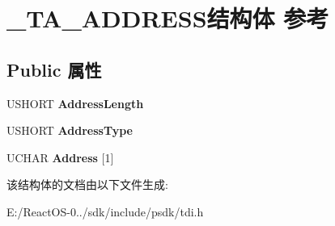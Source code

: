 \hypertarget{struct___t_a___a_d_d_r_e_s_s}{}\section{\+\_\+\+T\+A\+\_\+\+A\+D\+D\+R\+E\+S\+S结构体 参考}
\label{struct___t_a___a_d_d_r_e_s_s}
\subsection*{Public 属性}
\begin{DoxyCompactItemize}
\item 
\mbox{\label{struct___t_a___a_d_d_r_e_s_s_ac504429361c2d4bc57ed50d485991842}} 
U\+S\+H\+O\+RT {\bfseries Address\+Length}
\item 
\mbox{\label{struct___t_a___a_d_d_r_e_s_s_af8dd214d78a31a22538b8ceee50cca32}} 
U\+S\+H\+O\+RT {\bfseries Address\+Type}
\item 
\mbox{\label{struct___t_a___a_d_d_r_e_s_s_a22e81f55a70da515e5633e6eb936b00b}} 
U\+C\+H\+AR {\bfseries Address} \mbox{[}1\mbox{]}
\end{DoxyCompactItemize}


该结构体的文档由以下文件生成\+:\begin{DoxyCompactItemize}
\item 
E\+:/\+React\+O\+S-\/0../sdk/include/psdk/tdi.\+h\end{DoxyCompactItemize}
